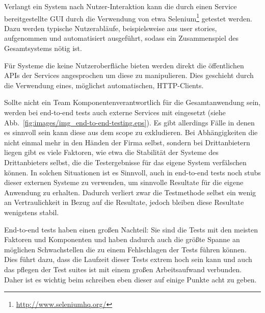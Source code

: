 \documentclass[12pt,a4paper,bibliography=totocnumbered,listof=totocnumbered]{scrartcl}
\begin{document}
Verlangt ein System nach Nutzer-Interaktion kann die durch einen Service bereitgestellte GUI durch die Verwendung von etwa Selenium\footnote{\url{http://www.seleniumhq.org/}} getestet werden. Dazu werden typische Nutzerabläufe, beispielsweise aus user stories, aufgenommen und automatisiert ausgeführt, sodass ein Zusammenspiel des Gesamtsystems nötig ist.\cite{clemson}

Für Systeme die keine Nutzeroberfläche bieten werden direkt die öffentlichen \acp{API} der Services angesprochen um diese zu manipulieren. Dies geschieht durch die Verwendung eines, möglichst automatischen, HTTP-Clients.\cite{clemson}


Sollte nicht ein Team Komponentenverantwortlich für die Gesamtanwendung sein,  werden bei end-to-end tests auch externe Services mit eingesetzt (siehe Abb.~\ref{fig:images/img_end-to-end-testing.eps}). Es gibt allerdings Fälle in denen es sinnvoll sein kann diese aus dem scope zu exkludieren. Bei Abhängigkeiten die nicht einmal mehr in den Händen der Firma selbst, sondern bei Drittanbietern liegen gibt es viele Faktoren, wie etwa die Stabilität der Systeme des Drittanbieters selbst, die die Testergebnisse für das eigene System verfälschen können. In solchen Situationen ist es Sinnvoll, auch in end-to-end tests noch stubs dieser externen Systeme zu verwenden, um sinnvolle Resultate für die eigene Anwendung zu erhalten. Dadurch verliert zwar die Testmethode selbst ein wenig an Vertraulichkeit in Bezug auf die Resultate, jedoch bleiben diese Resultate wenigstens stabil.\cite{clemson}

End-to-end tests haben einen großen Nachteil: Sie sind die Tests mit den meisten Faktoren und Komponenten und haben dadurch auch die größte Spanne an möglichen Schwachstellen die zu einem Fehlschlagen der Tests führen können. Dies führt dazu, dass die Laufzeit dieser Tests extrem hoch sein kann und auch das pflegen der Test suites ist mit einem großen Arbeitsaufwand verbunden.\cite{clemson} Daher ist es wichtig beim schreiben eben dieser auf einige Punkte acht zu geben.
\end{document}

